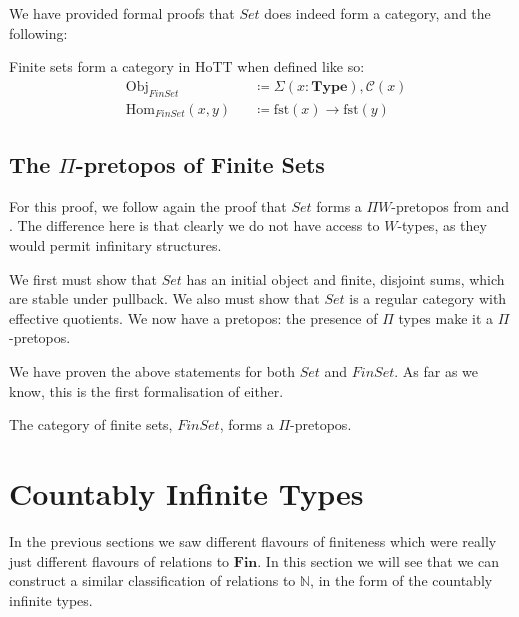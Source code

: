 We have provided formal proofs that \(\mathit{Set}\) does indeed form a
category, and the following:
\begin{romtheorem}
  Finite sets form a category in HoTT when defined like so:
  \begin{equation}
    \begin{aligned}
      &\text{Obj}_\mathit{FinSet}      &&\coloneqq \Sigma(x : \mathbf{Type}) , \mathcal{C}(x) \\
      &\text{Hom}_\mathit{FinSet}(x , y) &&\coloneqq  \text{fst}(x) \rightarrow \text{fst}(y)
    \end{aligned}
  \end{equation}
\end{romtheorem}
\subsection{The \(\Pi\)-pretopos of Finite Sets}
For this proof, we follow again the proof that \(\mathit{Set}\) forms a \(\Pi
W\)-pretopos from \cite[chapter 10]{hottbook} and
\cite{rijkeSetsHomotopyType2015}.
The difference here is that clearly we do not have access to \(W\)-types, as
they would permit infinitary structures.

We first must show that \(\mathit{Set}\) has an initial object and finite,
disjoint sums, which are stable under pullback.
We also must show that \(\mathit{Set}\) is a regular category with effective
quotients.
We now have a pretopos: the presence of \(\Pi\) types make it a
\(\Pi\)-pretopos.

We have proven the above statements for both \(\mathit{Set}\) and
\(\mathit{FinSet}\).
As far as we know, this is the first formalisation of either.
\begin{romtheorem} \label{finite-topos}
  The category of finite sets, \(\mathit{FinSet}\), forms a \(\Pi\)-pretopos.
\end{romtheorem}
\section{Countably Infinite Types} \label{infinite}
In the previous sections we saw different flavours of finiteness which were
really just different flavours of relations to \(\mathbf{Fin}\).
In this section we will see that we can construct a similar classification of
relations to \(\mathbb{N}\), in the form of the countably infinite types.
